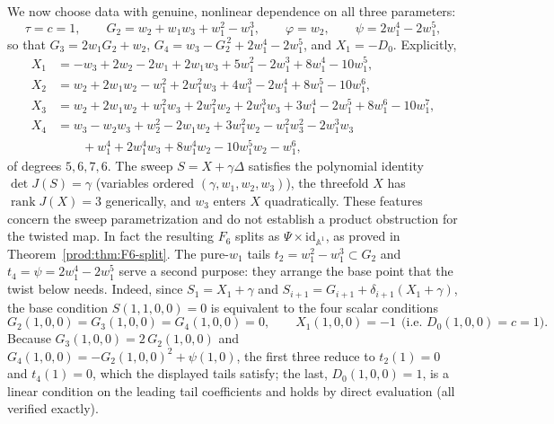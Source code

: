 \documentclass[11pt]{article}
\numberwithin{equation}{section}
\theoremstyle{plain}
\theoremstyle{definition}
\theoremstyle{remark}
\newcommand{\A}{\mathbb{A}}
\newcommand{\id}{\mathrm{id}}
\begin{document}
We now choose data with genuine, nonlinear dependence on all three
parameters:
\[
\tau=c=1,\qquad
G_2=w_2+w_1w_3+w_1^2-w_1^3,\qquad
\varphi=w_2,\qquad
\psi=2w_1^4-2w_1^5 ,
\]
so that $G_3=2w_1G_2+w_2$, $G_4=w_3-G_2^{\,2}+2w_1^4-2w_1^5$, and
$X_1=-D_0$. Explicitly,
\begin{align*}
X_1&=-w_3+2w_2-2w_1+2w_1w_3+5w_1^2-2w_1^3+8w_1^4-10w_1^5,\\
X_2&=w_2+2w_1w_2-w_1^2+2w_1^2w_3+4w_1^3-2w_1^4+8w_1^5-10w_1^6,\\
X_3&=w_2+2w_1w_2+w_1^2w_3+2w_1^2w_2+2w_1^3w_3+3w_1^4-2w_1^5+8w_1^6-10w_1^7,\\
X_4&=w_3-w_2w_3+w_2^2-2w_1w_2+3w_1^2w_2-w_1^2w_3^2-2w_1^3w_3\\
&\qquad +w_1^4+2w_1^4w_3+8w_1^4w_2-10w_1^5w_2-w_1^6 ,
\end{align*}
of degrees $5,6,7,6$. The sweep $S=X+\gamma\Delta$ satisfies the polynomial
identity $\det J(S)=\gamma$ (variables ordered $(\gamma,w_1,w_2,w_3)$), the
threefold $X$ has $\operatorname{rank}J(X)=3$ generically, and $w_3$ enters $X$
quadratically. These features concern the sweep parametrization and do
not establish a product obstruction for the twisted map. In fact the
resulting $F_6$ splits as $\Psi\times\id_{\A^1}$, as proved in
Theorem~\ref{prod:thm:F6-split}. The pure-$w_1$ tails
$t_2=w_1^2-w_1^3\subset G_2$ and $t_4=\psi=2w_1^4-2w_1^5$ serve a second
purpose: they arrange the base point that the twist below needs. Indeed, since
$S_1=X_1+\gamma$ and $S_{i+1}=G_{i+1}+\delta_{i+1}(X_1+\gamma)$, the base
condition $S(1,1,0,0)=0$ is equivalent to the four scalar conditions
\[
G_2(1,0,0)=G_3(1,0,0)=G_4(1,0,0)=0,\qquad
X_1(1,0,0)=-1\ \ \text{(i.e.\ }D_0(1,0,0)=c=1\text{)}.
\]
Because $G_3(1,0,0)=2\,G_2(1,0,0)$ and $G_4(1,0,0)=-G_2(1,0,0)^2+\psi(1,0)$,
the first three reduce to $t_2(1)=0$ and $t_4(1)=0$, which the displayed tails
satisfy; the last, $D_0(1,0,0)=1$, is a linear condition on the leading tail
coefficients and holds by direct evaluation (all verified exactly).
\end{document}
